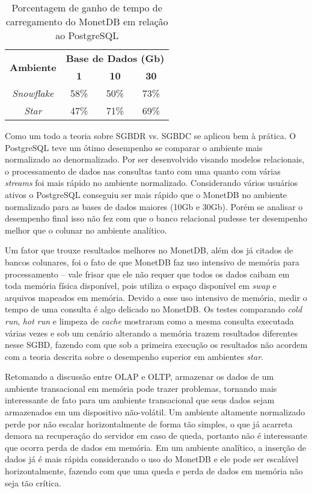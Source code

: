 \begin{table}[htpb]
    \centering
    \caption{Porcentagem de ganho de tempo de carregamento do MonetDB em relação ao PostgreSQL}
    \label{tab:ganho_carregamento}
    \begin{tabular}{|c|c|c|c|}
    \hline
    \multirow{2}{*}{\textbf{Ambiente}} & \multicolumn{3}{c|}{\textbf{Base de Dados (Gb)}} \\ \cline{2-4} 
                                       & \textbf{1}     & \textbf{10}    & \textbf{30}    \\ \hline
    \textit{Snowflake}                 & 58\%           & 50\%           & 73\%           \\ \hline
    \textit{Star}                      & 47\%           & 71\%           & 69\%           \\ \hline
    \end{tabular}
    \end{table}
    
Como um todo a teoria sobre SGBDR vs. SGBDC se aplicou bem à prática. O PostgreSQL teve um ótimo desempenho se comparar o ambiente mais normalizado ao denormalizado. Por ser desenvolvido visando modelos relacionais, o processamento de dados nas consultas tanto com uma quanto com várias \textit{streams} foi mais rápido no ambiente normalizado. Considerando vários usuários ativos o PostgreSQL conseguiu ser mais rápido que o MonetDB no ambiente normalizado para as bases de dados maiores (10Gb e 30Gb). Porém se analisar o desempenho final isso não fez com que o banco relacional pudesse ter desempenho melhor que o colunar no ambiente analítico.

Um fator que trouxe resultados melhores no MonetDB, além dos já citados de bancos colunares, foi o fato de que MonetDB faz uso intensivo de memória para processamento -- vale frisar que ele não requer que todos os dados caibam em toda memória física disponível, pois utiliza o espaço disponível em \textit{swap} e arquivos mapeados em memória. Devido a esse uso intensivo de memória, medir o tempo de uma consulta é algo delicado no MonetDB. Os testes comparando \textit{cold run}, \textit{hot run} e limpeza de \textit{cache} mostraram como a mesma consulta executada várias vezes e sob um cenário alterando a memória trazem resultados diferentes nesse SGBD, fazendo com que sob a primeira execução os resultados não acordem com a teoria descrita sobre o desempenho superior em ambientes \textit{star}.

Retomando a discussão entre OLAP e OLTP, armazenar os dados de um ambiente transacional em memória pode trazer problemas, tornando mais interessante de fato para um ambiente transacional que seus dados sejam armazenados em um dispositivo não-volátil. Um ambiente altamente normalizado perde por não escalar horizontalmente de forma tão simples, o que já acarreta demora na recuperação do servidor em caso de queda, portanto não é interessante que ocorra perda de dados em memória. Em um ambiente analítico, a inserção de dados já é mais rápida considerando o uso do MonetDB e ele pode ser escalável horizontalmente, fazendo com que uma queda e perda de dados em memória não seja tão crítica.

